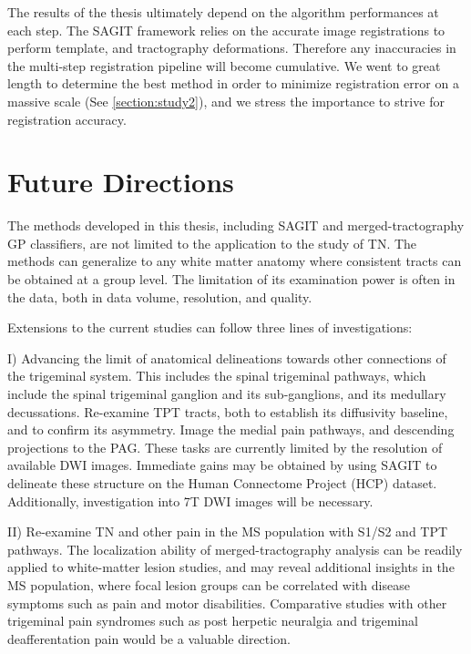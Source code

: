 The results of the thesis ultimately depend on the algorithm performances at each step. The SAGIT framework relies on the accurate image registrations to perform template, and tractography deformations. Therefore any inaccuracies in the multi-step registration pipeline will become cumulative. We went to great length to determine the best method in order to minimize registration error on a massive scale (See \ref{section:study2}), and we stress the importance to strive for registration accuracy. 



\section{Future Directions}

The methods developed in this thesis, including SAGIT and merged-tractography GP classifiers, are not limited to the application to the study of TN. The methods can generalize to any white matter anatomy where consistent tracts can be obtained at a group level. The limitation of its examination power is often in the data, both in data volume, resolution, and quality.

Extensions to the current studies can follow three lines of investigations:

I) Advancing the limit of anatomical delineations towards other connections of the trigeminal system. This includes the spinal trigeminal pathways, which include the spinal trigeminal ganglion and its sub-ganglions, and its medullary decussations. Re-examine TPT tracts, both to establish its diffusivity baseline, and to confirm its asymmetry. Image the medial pain pathways, and descending projections to the PAG. These tasks are currently limited by the resolution of available DWI images. Immediate gains may be obtained by using SAGIT to delineate these structure on the Human Connectome Project (HCP) dataset. Additionally, investigation into 7T DWI images will be necessary. 

II) Re-examine TN and other pain in the MS population with S1/S2 and TPT pathways. The localization ability of merged-tractography analysis can be readily applied to white-matter lesion studies, and may reveal additional insights in the MS population, where focal lesion groups can be correlated with disease symptoms such as pain and motor disabilities. Comparative studies with other trigeminal pain syndromes such as post herpetic neuralgia and trigeminal deafferentation pain would be a valuable direction.

